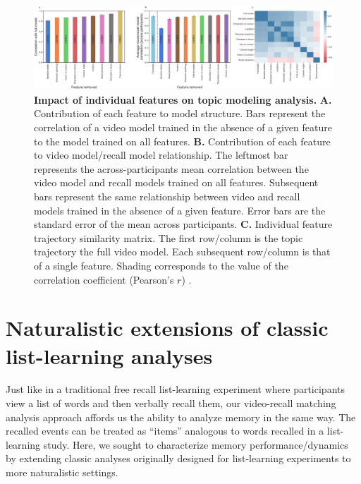 \documentclass{article}
\begin{document}
\begin{figure}[tb]
\centering
\includegraphics[width=1\textwidth]{figs/supp4_feature_value.pdf}
\caption{\small \textbf{Impact of individual features on topic modeling analysis.} \textbf{A.} Contribution of each feature to model structure. Bars represent the correlation of a video model trained in the absence of a given feature to the model trained on all features. \textbf{B.} Contribution of each feature to video model/recall model relationship. The leftmost bar represents the across-participants mean correlation between the video model and recall models trained on all features. Subsequent bars represent the same relationship between video and recall models trained in the absence of a given feature. Error bars are the standard error of the mean across participants. \textbf{C.}  Individual feature trajectory similarity matrix. The first row/column is the topic trajectory the full video model. Each subsequent row/column is that of a single feature. Shading corresponds to the value of the correlation coefficient (Pearson's $r$) .}
\label{fig:feature-importance}
\end{figure}

\section*{Naturalistic extensions of classic list-learning analyses}
Just like in a traditional free recall list-learning experiment where participants view a list of words and then verbally recall them, our video-recall matching analysis approach affords us the ability to analyze memory in the same way. The recalled events can be treated as ``items'' analogous to words recalled in a list-learning study. Here, we sought to characterize memory performance/dynamics by extending classic analyses originally designed for list-learning experiments to more naturalistic settings.
\end{document}
